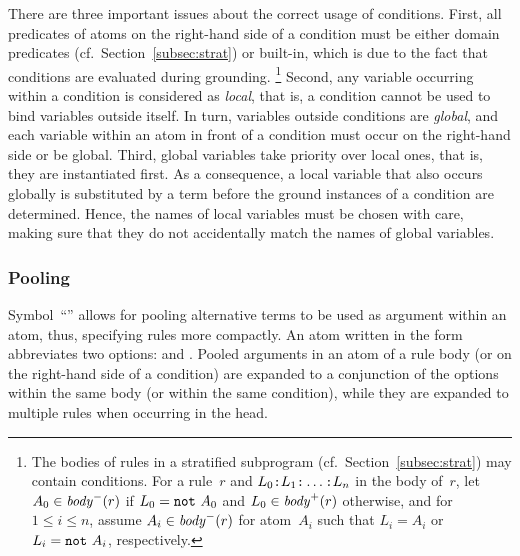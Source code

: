There are three important issues about the correct usage of conditions.
First, all predicates of atoms on the right-hand side of a condition
must be either domain predicates (cf.\ Section~\ref{subsec:strat}) or built-in,
which is due to the fact that conditions are evaluated during grounding.%
\footnote{%
  The bodies of rules in a stratified subprogram (cf.\ Section~\ref{subsec:strat})
  may contain conditions.
  For a rule~$r$ and
  $L_0\texttt{:}L_1\texttt{:}\dots\texttt{:}L_n$
  in the body of~$r$,
  let $A_0\in\mathit{body}^-(r)$ if $L_0=\texttt{not}~A_0$
  and $L_0\in\mathit{body}^+(r)$ otherwise,
  and for $1\leq i\leq n$, 
  assume $A_i\in\mathit{body}^-(r)$ for atom~$A_i$
  such that $L_i=A_i$ or $L_i=\texttt{not}~A_i$, respectively.
  }
Second, any variable occurring within a condition is considered as \emph{local},
that is, a condition cannot be used to bind variables outside itself.
In turn, variables outside conditions are \emph{global}, and each variable
within an atom in front of a condition must occur on the right-hand side or
be global.
Third, global variables take priority over local ones, that is,
they are instantiated first.
As a consequence, a local variable that also occurs globally is substituted by a term
before the ground instances of a condition are determined.
Hence, the names of local variables must be chosen with care,
making sure that they do not accidentally match the names of global variables.


\subsubsection{Pooling}\label{subsec:gringo:pool}

Symbol~``\code{;}'' allows for pooling alternative terms to be used as
argument within an atom, thus, specifying rules more compactly.
An atom written in the form 
abbreviates two options:
 and .
Pooled arguments in an atom of a rule body 
(or on the right-hand side of a condition) are expanded to a conjunction
of the options within the same body (or within the same condition),
while they are expanded to multiple rules when occurring in the head.

